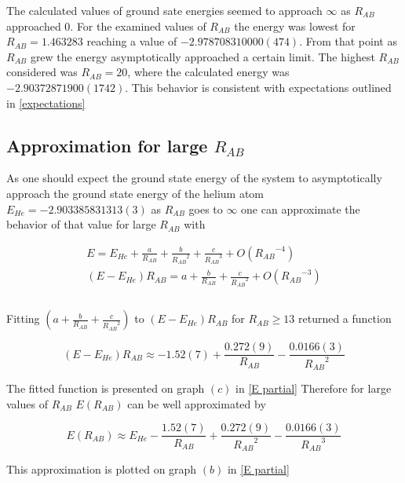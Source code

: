 \documentclass{pracalicmgr}
\begin{document}
The calculated values of ground sate energies seemed to approach $\infty$ as $R_{AB}$ approached $0$. For the examined values of $R_{AB}$ the energy was lowest for $R_{AB} = 1.463283$ reaching a value of $-2.978708310000(474)$. From that point as $R_{AB}$ grew the energy asymptotically approached a certain limit. The highest $R_{AB}$ considered was $R_{AB} = 20$, where the calculated energy was $-2.90372871900(1742)$. This behavior is consistent with expectations outlined in \ref{expectations}

\subsection*{Approximation for large $R_{AB}$}

As one should expect the ground state energy of the system to asymptotically approach the ground state energy of the helium atom $ E_{He}=-2.903385831313(3)$ as $R_{AB}$ goes to $\infty$ one can approximate the behavior of that value for large $R_{AB}$ with

\begin{align*} 
    E = E_{He} + \frac{a}{R_{AB}} + \frac{b}{{R_{AB}}^2} + \frac{c}{{R_{AB}}^3} + O\left({R_{AB}}^{-4}\right)\\
    \left(E - E_{He}\right){R_{AB}} = a + \frac{b}{{R_{AB}}} + \frac{c}{{R_{AB}}^2} + O\left({R_{AB}}^{-3}\right)\\\\
\end{align*}

Fitting $\left(a + \frac{b}{{R_{AB}}} + \frac{c}{{R_{AB}}^2}\right)$ to $\left(E - E_{He}\right)R_{AB}$ for $R_{AB} \geq 13$ returned a function

\begin{equation}
    \left(E - E_{He}\right)R_{AB} \approx -1.52(7) + \frac{0.272(9)}{{R_{AB}}} - \frac{0.0166(3)}{{R_{AB}}^2}
\end{equation}

The fitted function is presented on graph $(c)$ in \ref{E partial} Therefore for large values of $R_{AB}$ $ E\left({R_{AB}}\right)$ can be well approximated by

\begin{equation}
    E\left({R_{AB}}\right) \approx E_{He}- \frac{1.52(7)}{{R_{AB}}} + \frac{0.272(9)}{{R_{AB}}^2} - \frac{0.0166(3)}{{R_{AB}}^3}
\end{equation}

This approximation is plotted on graph $(b)$ in \ref{E partial}
\end{document}

